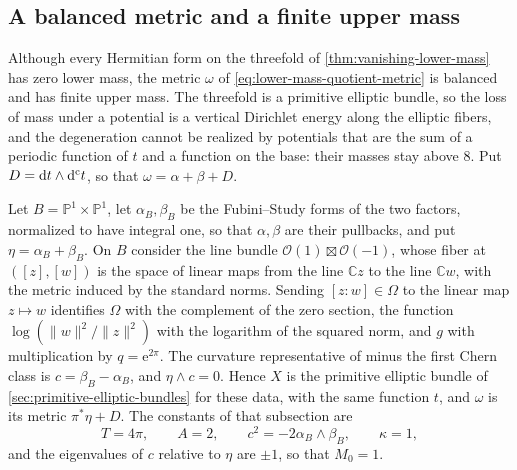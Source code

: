 \subsection{A balanced metric and a finite upper mass}
\label{sec:lower-mass-metric-geometry}

Although every Hermitian form on the threefold of \cref{thm:vanishing-lower-mass} has zero lower mass, the metric $\omega$ of \eqref{eq:lower-mass-quotient-metric} is balanced and has finite upper mass. The threefold is a primitive elliptic bundle, so the loss of mass under a potential is a vertical Dirichlet energy along the elliptic fibers, and the degeneration cannot be realized by potentials that are the sum of a periodic function of $t$ and a function on the base: their masses stay above $8$. Put $D=\mathrm{d}t\wedge\mathrm d^{\mathrm c} t$, so that $\omega=\alpha+\beta+D$.

Let $B=\mathbb P^1\times\mathbb P^1$, let $\alpha_B,\beta_B$ be the Fubini--Study forms of the two factors, normalized to have integral one, so that $\alpha,\beta$ are their pullbacks, and put $\eta=\alpha_B+\beta_B$. On $B$ consider the line bundle $\mathcal O(1)\boxtimes\mathcal O(-1)$, whose fiber at $([z],[w])$ is the space of linear maps from the line $\mathbb Cz$ to the line $\mathbb Cw$, with the metric induced by the standard norms. Sending $[z:w]\in\Omega$ to the linear map $z\mapsto w$ identifies $\Omega$ with the complement of the zero section, the function $\log(\|w\|^2/\|z\|^2)$ with the logarithm of the squared norm, and $g$ with multiplication by $q=\mathrm e^{2\pi}$. The curvature representative of minus the first Chern class is $c=\beta_B-\alpha_B$, and $\eta\wedge c=0$. Hence $X$ is the primitive elliptic bundle of \cref{sec:primitive-elliptic-bundles} for these data, with the same function $t$, and $\omega$ is its metric $\pi^*\eta+D$. The constants of that subsection are
\[
 T=4\pi,\qquad A=2,\qquad c^2=-2\alpha_B\wedge\beta_B,\qquad \kappa=1,
\]
and the eigenvalues of $c$ relative to $\eta$ are $\pm1$, so that $M_0=1$.

